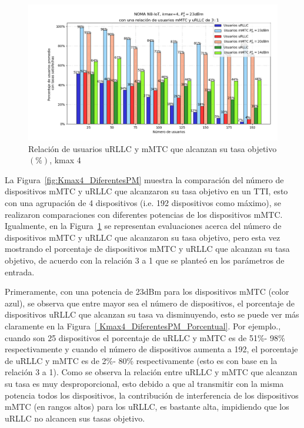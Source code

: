 \begin{figure}[th]
    \centering
    \includegraphics[scale=.65]{Figures/ResultadosNOMA/Kmax4_DiferentesPM_Porcentual.png}
    \decoRule
    \caption[Relación de usuarios uRLLC y mMTC que alcanzan su tasa objetivo $(\%)$, kmax 4]{Relación de usuarios uRLLC y mMTC que alcanzan su tasa objetivo$(\%)$, kmax 4}
    \label{fig:Kmax4_DiferentesPM_Porcentual}
\end{figure}


La Figura~\ref{fig:Kmax4_DiferentesPM} muestra la comparación del número de dispositivos mMTC y uRLLC que alcanzaron su tasa objetivo en un TTI, esto con una agrupación de 4 dispositivos (i.e. 192 dispositivos como máximo), se realizaron comparaciones con diferentes potencias de los dispositivos mMTC. Igualmente, en la Figura~\ref{fig:Kmax4_DiferentesPM_Porcentual} se representan evaluaciones acerca del número de dispositivos mMTC y uRLLC que alcanzaron su tasa objetivo, pero esta vez mostrando el porcentaje de dispositivos mMTC y uRLLC que alcanzan su tasa objetivo, de acuerdo con la relación 3 a 1 que se planteó en los parámetros de entrada.\newline

Primeramente, con una potencia de 23dBm para los dispositivos mMTC (color azul), se observa que entre mayor sea el número de dispositivos, el porcentaje de dispositivos uRLLC que alcanzan su tasa va disminuyendo, esto se puede ver más claramente en la Figura~\ref{ Kmax4_DiferentesPM_Porcentual}. Por ejemplo., cuando son 25 dispositivos el porcentaje de uRLLC y mMTC es de 51\%- 98\% respectivamente y cuando el número de dispositivos aumenta a 192, el porcentaje de uRLLC y mMTC es de 2\%- 80\% respectivamente (esto es con base en la relación 3 a 1). Como se observa la relación entre uRLLC y mMTC que alcanzan su tasa es muy desproporcional, esto debido a que al transmitir con la misma potencia todos los dispositivos, la contribución de interferencia de los dispositivos mMTC (en rangos altos) para los uRLLC, es bastante alta, impidiendo que los uRLLC no alcancen sus tasas objetivo.\newline

